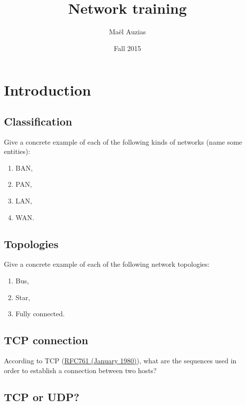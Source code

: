 \documentclass[11pt]{article}
\begin{document}
\title{Network training}
\date{Fall 2015}
\author{Maël Auzias}
\maketitle



\section{Introduction}
\subsection{Classification}
Give a concrete example of each of the following kinds of networks (name some entities):
  \begin{enumerate}
    \item BAN,  %
    \item PAN,  %
    \item LAN,  %
    \item WAN.  %
  \end{enumerate}

\subsection{Topologies}
Give a concrete example of each of the following network topologies:
  \begin{enumerate}
    \item Bus,             %
    \item Star,            %
    \item Fully connected. %
  \end{enumerate}

\subsection{TCP connection}
According to TCP (\color{blue}\href{http://tools.ietf.org/html/rfc761}{RFC761 (January 1980)})\color{black}, what are the sequences used in order to establish a connection between two hosts?

\subsection{TCP or UDP?}
\end{document}
